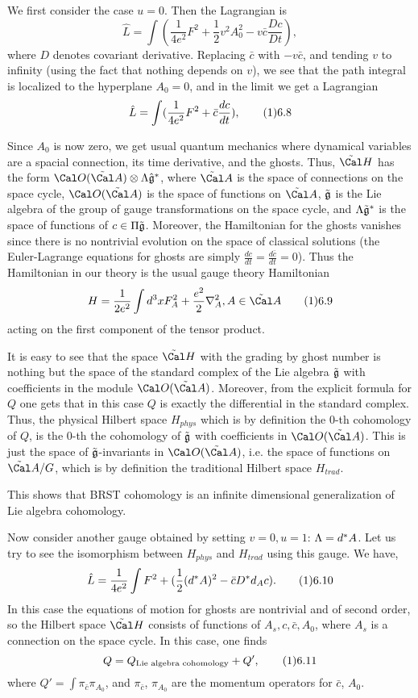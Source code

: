 We first consider the case $u=0$. Then the Lagrangian is
$$
\hat L=\int (\frac{1}{4e^2}F^2+\frac{1}{2}v^2A_0^2-
v\bar c\frac{D c}{D t}), 
$$
where $D$ denotes covariant derivative. 
Replacing $\bar c$ with $-v\bar c$, and tending $v$ to infinity
(using the fact that nothing depends on $v$), 
we see that the path integral is localized 
to the hyperplane $A_0=0$, and in the limit we  get a Lagrangian 
$$
\hat L=\int (\frac{1}{4e^2}F^2+
\bar c\frac{d c}{d t}), 
\tag 16.8
$$
 
Since $A_0$ is now zero, we get usual quantum mechanics where 
dynamical variables are a spacial connection, its time derivative, 
and the ghosts. Thus, 
$\tilde\Cal H$ has the form $\O(\tilde\Cal A)\o \L\hat \g^*$, 
where $\tilde\Cal A$ is the space of connections on the space cycle, 
$\O(\tilde\Cal A)$ is the space of functions on $\tilde\Cal A$, 
$\tilde{\frak g}$ is the Lie algebra of the group of gauge transformations
on the space cycle, 
and $\Lambda\tilde{\frak g}^*$ is the space of functions of $c\in\Pi\tilde{\frak g}$.
Moreover, the Hamiltonian for 
the ghosts vanishes since there is no nontrivial evolution 
on the space of classical solutions (the Euler-Lagrange
equations for ghosts are simply $\frac{d c}{d t}=\frac{d \bar c}{d t}=0$). 
Thus the Hamiltonian in our theory is the usual gauge theory Hamiltonian 
$$
H=\frac{1}{2e^2}\int d^3x F_A^2+\frac{e^2}{2}\nabla_A^2, A\in \tilde\Cal A\tag 16.9
$$
acting on the first component of the tensor product. 

It is easy to see that the space $\tilde\Cal H$ with the grading 
by ghost number is nothing but the space of the standard complex of the Lie 
algebra $\tilde{\frak g}$ with coefficients in the module $\O(\tilde\Cal A)$. 
Moreover, from the explicit formula for $Q$ 
one gets that in this case $Q$ is 
exactly the differential in the standard complex. Thus, 
the physical Hilbert space $H_{phys}$ which is by definition 
the 0-th cohomology of $Q$, is the 0-th the cohomology of $\tilde{\frak g}$ 
with coefficients in $\O(\tilde\Cal A)$. 
This is just the space of $\tilde{\frak g}$-invariants 
in $\O(\tilde\Cal A)$, i.e. the space of functions on 
$\tilde\Cal A/G$, which is 
by definition the traditional Hilbert space $H_{trad}$. 

This shows that BRST cohomology is an infinite dimensional generalization of 
Lie algebra cohomology.

Now consider another gauge obtained by setting $v=0,u=1$: $\Lambda=d^*A$. 
Let us try to see the isomorphism between $H_{phys}$ and $H_{trad}$ 
using this gauge. We have, 
$$
\hat L=\frac{1}{4e^2}\int F^2+(\frac{1}{2}(d^*A)^2-\bar cD^*d_Ac).\tag 16.10
$$
In this case the equations of motion for ghosts are nontrivial 
and of second order, so the Hilbert space 
$\tilde\Cal H$ consists of functions of $A_s,c,\bar c,A_0$, where 
$A_s$ is a connection on the space cycle. In this case, one finds 
$$
Q=Q_{\text{Lie algebra cohomology}}+Q',\tag 16.11
$$
where $Q'=\int \pi_{\bar c}\pi_{A_0}$, 
and $\pi_{\bar c}$, $\pi_{A_0}$ are the momentum operators for 
$\bar c$, $A_0$. 

